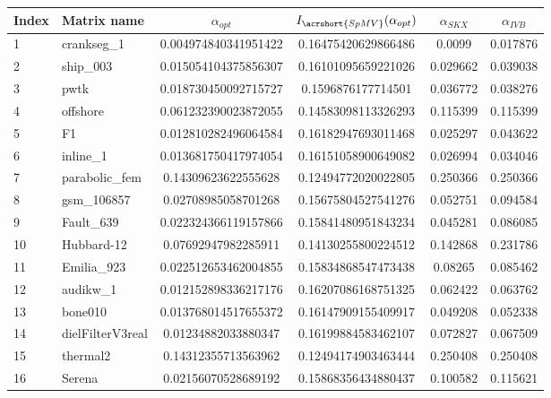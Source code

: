 \begin{tabular}{|l|l|S[round-mode=places,round-precision=4]|S[round-mode=places,round-precision=4]|S[round-mode=places,round-precision=4]|S[round-mode=places,round-precision=4]|}
\toprule
{Index} & {Matrix name} &  {$\alpha_{opt}$} & {$I_{\acrshort{SpMV}}(\alpha_{opt})$} & {$\alpha_{SKX}$} & {$\alpha_{IVB}$}  \\
\midrule
{1}& {	crankseg\_1                }	& 0.004974840341951422	& 0.16475420629866486	& 0.0099	& 0.017876	\\
{2}& {	ship\_003                  }	& 0.015054104375856307	& 0.16101095659221026	& 0.029662	& 0.039038	\\
{3}& {	pwtk                      }	& 0.018730450092715727	& 0.1596876177714501	& 0.036772	& 0.038276	\\
{4}& {	offshore                  }	& 0.061232390023872055	& 0.14583098113326293	& 0.115399	& 0.115399	\\
{5}& {	F1                        }	& 0.012810282496064584	& 0.16182947693011468	& 0.025297	& 0.043622	\\
{6}& {	inline\_1                  }	& 0.013681750417974054	& 0.16151058900649082	& 0.026994	& 0.034046	\\
{7}& {	parabolic\_fem             }	& 0.14309623622555628	& 0.12494772020022805	& 0.250366	& 0.250366	\\
{8}& {	gsm\_106857                }	& 0.02708985058701268	& 0.15675804527541276	& 0.052751	& 0.094584	\\
{9}& {	Fault\_639                 }	& 0.022324366119157866	& 0.15841480951843234	& 0.045281	& 0.086085	\\
{10}& {	Hubbard-12                }	& 0.07692947982285911	& 0.14130255800224512	& 0.142868	& 0.231786	\\
{11}& {	Emilia\_923                }	& 0.022512653462004855	& 0.15834868547473438	& 0.08265	& 0.085462	\\
{12}& {	audikw\_1                  }	& 0.012152898336217176	& 0.16207086168751325	& 0.062422	& 0.063762	\\
{13}& {	bone010                   }	& 0.013768014517655372	& 0.16147909155409917	& 0.049208	& 0.052338	\\
{14}& {	dielFilterV3real          }	& 0.01234882033880347	& 0.16199884583462107	& 0.072827	& 0.067509	\\
{15}& {	thermal2                  }	& 0.14312355713563962	& 0.12494174903463444	& 0.250408	& 0.250408	\\
{16}& {	Serena                    }	& 0.02156070528689192	& 0.15868356434880437	& 0.100582	& 0.115621	\\

\end{tabular}
